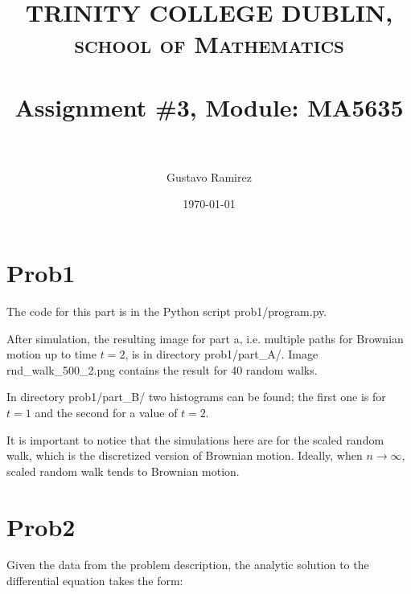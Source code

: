 \documentclass[paper=a4, fontsize=11pt]{scrartcl} %
\title{	
\normalfont \normalsize 
\textsc{TRINITY COLLEGE DUBLIN, school of Mathematics} \\ [25pt] %
\horrule{0.5pt} \\[0.4cm] %
\huge Assignment \#3, Module: MA5635 \\ %
\horrule{2pt} \\[0.5cm] %
}
\author{Gustavo Ramirez} %
\date{\normalsize\today} %
\numberwithin{equation}{section} %
\numberwithin{figure}{section} %
\numberwithin{table}{section} %
\begin{document}
\maketitle %


\begin{comment}
\section{Problem description}

\begin{enumerate}
\item 
\item 
\item 
\item 
\end{enumerate}

\end{comment}

\newpage





\section{Prob1}

The code for this part is in the Python script prob1/program.py.

After simulation, the resulting image for part a, i.e. multiple paths for Brownian motion up to time $t = 2$, is in directory prob1/part\_A/. Image rnd\_walk\_500\_2.png contains the result for 40 random walks.

In directory prob1/part\_B/ two histograms can be found; the first one is for $t = 1$ and the second for a value of $t = 2$.

It is important to notice that the simulations here are for the scaled random walk, which is the discretized version of Brownian motion. Ideally, when $n \rightarrow \infty$, scaled random walk tends to Brownian motion.

\section{Prob2}

Given the data from the problem description, the analytic solution to the differential equation takes the form:
\end{document}

